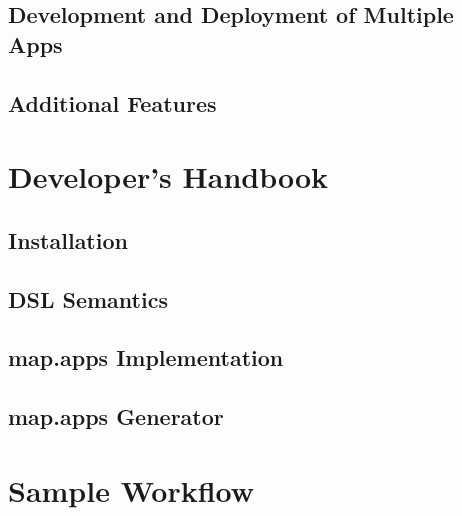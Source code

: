 \documentclass[a4paper, 12pt, titlepage, headsepline, listof = totoc, bibliography = totoc, numbers = noenddot]{scrbook} %
\begin{document}
\section{Development and Deployment of Multiple Apps}
\label{sec:developAndDeployMultiApps}


\section{Additional Features}
\label{sec:Additional Features}



\chapter{Developer's Handbook}


\section{Installation}


\section{DSL Semantics}


\section{map.apps Implementation}


\section{map.apps Generator}



\clearpage
\appendix
{}		%
%

\chapter{Sample Workflow}

\end{document}
